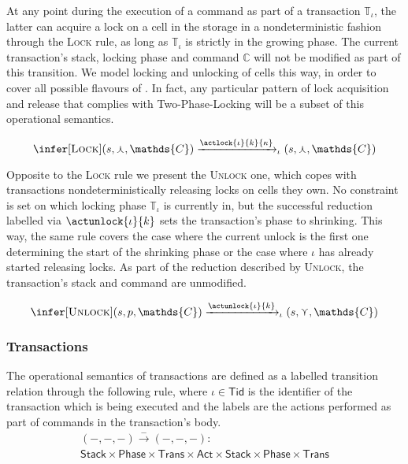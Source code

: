 At any point during the execution of a command as part of a transaction $\mathds{T}_\iota$, the latter can acquire a lock  on a cell in the storage in a nondeterministic fashion through the \textsc{Lock} rule, as long as $\mathds{T}_\iota$ is strictly in the growing phase. The current transaction's stack, locking phase and command $\mathds{C}$ will not be modified as part of this transition. We model locking and unlocking of cells this way, in order to cover all possible flavours of \tpl. In fact, any particular pattern of lock acquisition and release that complies with Two-Phase-Locking will be a subset of this operational semantics.

\[
\infer[\textsc{Lock}]
{
	(s, \curlywedge, \mathds{C})
	\xrightarrow{\actlock{\iota}{k}{\kappa}}_\iota
	(s, \curlywedge, \mathds{C})
}
{}
\]

Opposite to the \textsc{Lock} rule we present the \textsc{Unlock} one, which copes with transactions nondeterministically releasing locks on cells they own. No constraint is set on which locking phase $\mathds{T}_\iota$ is currently in, but the successful reduction labelled via $\actunlock{\iota}{k}$ sets the transaction's phase to shrinking. This way, the same rule covers the case where the current unlock is the first one determining the start of the shrinking phase or the case where $\iota$ has already started releasing locks. As part of the reduction described by \textsc{Unlock}, the transaction's stack and command are unmodified.

\[
\infer[\textsc{Unlock}]
{
	(s, p, \mathds{C})
	\xrightarrow{\actunlock{\iota}{k}}_\iota
	(s, \curlyvee, \mathds{C})
}
{}
\]

\subsubsection{Transactions}

The operational semantics of transactions are defined as a labelled transition relation through the following rule, where $\iota \in \mathsf{Tid}$ is the identifier of the transaction which is being executed and the labels are the actions performed as part of commands in the transaction's body.
\begin{gather*}
	(-, -, -) \xrightarrow{-} (-, -, -) : \\
	\mathsf{Stack} \times \mathsf{Phase} \times \mathsf{Trans}
	\times \mathsf{Act} \times
	\mathsf{Stack} \times \mathsf{Phase} \times \mathsf{Trans}
\end{gather*}


